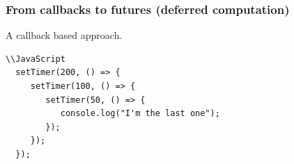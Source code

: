 \begin{frame}[fragile]
    \frametitle{From callbacks to futures (deferred computation)}
    A callback based approach.
    \begin{block}{}
        \begin{verbatim}
\\JavaScript 
  setTimer(200, () => {
     setTimer(100, () => {
        setTimer(50, () => {
           console.log("I'm the last one");
        });
     });
  });
        \end{verbatim}
    \end{block}
    
\end{frame}


